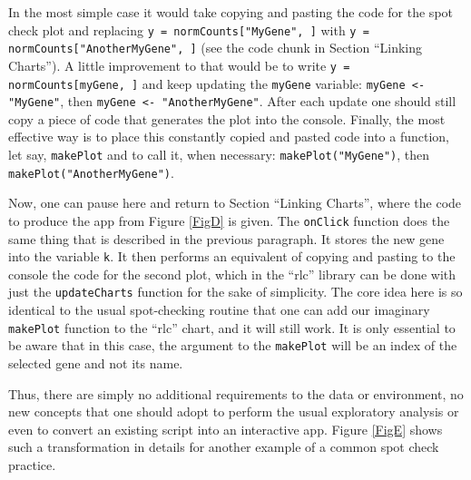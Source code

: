 \documentclass[twocolumn,10pt]{article}
\begin{document}
In the most simple case it would take copying and pasting the code for the spot check plot and replacing \texttt{y = normCounts["MyGene", ]} with \texttt{y = normCounts["AnotherMyGene", ]} (see the code chunk in Section ``Linking Charts''). A little improvement to that would be to write \texttt{y = normCounts[myGene, ]} and keep updating the \texttt{myGene} variable: \texttt{myGene <- "MyGene"}, then \texttt{myGene <- "AnotherMyGene"}. After each update one should still copy a piece of code that generates the plot into the console. Finally, the most effective way is to place this constantly copied and pasted code into a function, let say, \texttt{makePlot} and to call it, when necessary: \texttt{makePlot("MyGene")}, then \texttt{makePlot("AnotherMyGene")}.

Now, one can pause here and return to Section ``Linking Charts'', where the code to produce the app from Figure \ref{FigD} is given. The \texttt{onClick} function does the same thing that is described in the previous paragraph. It stores the new gene into the variable \texttt{k}. It then performs an equivalent of copying and pasting to the console the code for the second plot, which in the ``rlc'' library can be done with just the \texttt{updateCharts} function for the sake of simplicity. The core idea here is so identical to the usual spot-checking routine that one can add our imaginary \texttt{makePlot} function to the ``rlc'' chart, and it will still work. It is only essential to be aware that in this case, the argument to the \texttt{makePlot} will be an index of the selected gene and not its name.

Thus, there are simply no additional requirements to the data or environment, no new concepts that one should adopt to perform the usual exploratory analysis or even to convert an existing script into an interactive app. Figure \ref{FigE} shows such a transformation in details for another example of a common spot check practice.
\end{document}
